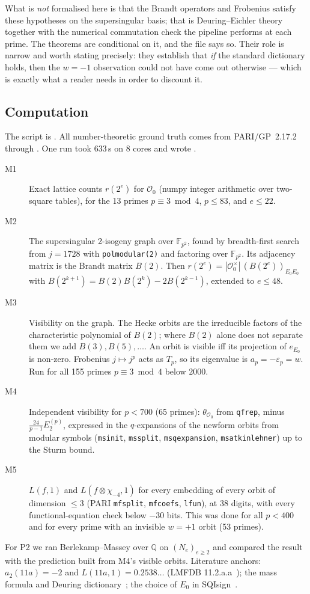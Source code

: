 \documentclass[11pt,a4paper]{article}
\theoremstyle{definition}
\newcommand{\Oz}{\mathcal{O}_0}
\begin{document}
What is \emph{not} formalised here is that the Brandt operators and Frobenius satisfy these hypotheses on the supersingular basis; that is Deuring--Eichler theory together with the numerical commutation check the pipeline performs at each prime. The theorems are conditional on it, and the file says so. Their role is narrow and worth stating precisely: they establish that \emph{if} the standard dictionary holds, then the $w=-1$ observation could not have come out otherwise --- which is exactly what a reader needs in order to discount it.

\subsection{Computation}
The script is . All number-theoretic ground truth comes from PARI/GP~2.17.2 through . One run took $633$\,s on 8 cores and wrote .
\begin{description}
  \item[M1] Exact lattice counts $r(2^e)$ for $\Oz$ (numpy integer arithmetic over two-square tables), for the 13 primes $p\equiv3\bmod4$, $p\le83$, and $e\le22$.
  \item[M2] The supersingular 2-isogeny graph over $\mathbb F_{p^2}$, found by breadth-first search from $j=1728$ with \texttt{polmodular(2)} and factoring over $\mathbb F_{p^2}$. Its adjacency matrix is the Brandt matrix $B(2)$. Then $r(2^e)=|\Oz^\times|\,(B(2^e))_{E_0E_0}$ with $B(2^{k+1})=B(2)B(2^k)-2B(2^{k-1})$, extended to $e\le48$.
  \item[M3] Visibility on the graph. The Hecke orbits are the irreducible factors of the characteristic polynomial of $B(2)$; where $B(2)$ alone does not separate them we add $B(3),B(5),\dots$. An orbit is visible iff its projection of $e_{E_0}$ is non-zero. Frobenius $j\mapsto j^p$ acts as $T_p$, so its eigenvalue is $a_p=-\varepsilon_p=w$. Run for all 155 primes $p\equiv3\bmod4$ below $2000$.
  \item[M4] Independent visibility for $p<700$ (65 primes): $\theta_{\Oz}$ from \texttt{qfrep}, minus $\frac{24}{p-1}E_2^{(p)}$, expressed in the $q$-expansions of the newform orbits from modular symbols (\texttt{msinit}, \texttt{mssplit}, \texttt{msqexpansion}, \texttt{msatkinlehner}) up to the Sturm bound.
  \item[M5] $L(f,1)$ and $L(f\otimes\chi_{-4},1)$ for every embedding of every orbit of dimension $\le3$ (PARI \texttt{mfsplit}, \texttt{mfcoefs}, \texttt{lfun}), at 38 digits, with every functional-equation check below $-30$ bits. This was done for all $p<400$ and for every prime with an invisible $w=+1$ orbit (53 primes).
\end{description}
For P2 we ran Berlekamp--Massey over $\mathbb Q$ on $(N_e)_{e\ge2}$ and compared the result with the prediction built from M4's visible orbits. Literature anchors: $a_2(11a)=-2$ and $L(11a,1)=0.2538\ldots$ (LMFDB 11.2.a.a~\cite{LMFDB}); the mass formula and Deuring dictionary~\cite{Voight}; the choice of $E_0$ in SQIsign~\cite{SQIsignSpec}.
\end{document}
